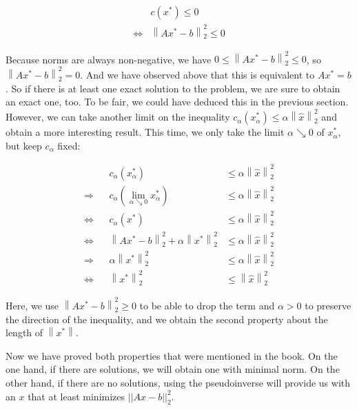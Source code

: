 \documentclass[]{scrartcl}
\begin{document}
\[\begin{align*}
& c \left( x^{*} \right) \leq 0 \\
\Leftrightarrow &  \left\| Ax^{*}-b\right\| _{2}^{2} \le 0
\end{align*}
\]

Because norms are always non-negative, we have
\(0 \le \left\| Ax^{*}-b\right\| _{2}^{2} \le 0\), so
\(\left\| Ax^{*}-b\right\| _{2}^{2} = 0\). And we have observed above
that this is equivalent to \(Ax^{*} = b\). So if there is at least one
exact solution to the problem, we are sure to obtain an exact one, too.
To be fair, we could have deduced this in the previous section. However,
we can take another limit on the inequality
\(c_{\alpha}\left( x_{\alpha }^{*}\right) \leq \alpha \left\| \hat x\right\| _{2}^{2}\)
and obtain a more interesting result. This time, we only take the limit
\(\alpha \searrow 0\) of \(x^{*}_\alpha\), but keep \(c_\alpha\) fixed:

\[
\begin{align*}
&&c_{\alpha}\left( x_{\alpha }^{*}\right) &\leq \alpha \left\| \hat x\right\| _{2}^{2} \\
\Rightarrow  && c_{\alpha}\left( \lim_{\alpha \searrow 0} x_{\alpha }^{*}\right) &\leq \alpha \left\| \hat x\right\| _{2}^{2}  \\
\Leftrightarrow && c_{\alpha}\left( x^{*} \right) &\leq \alpha \left\| \hat x\right\| _{2}^{2} \\
\Leftrightarrow && \left\| Ax^{*}-b\right\| _{2}^{2}+\alpha \left\| x^{*}\right\| _{2}^{2} &\leq \alpha \left\| \hat x\right\| _{2}^{2} \\
\Rightarrow && \alpha \left\| x^{*}\right\| _{2}^{2} &\leq \alpha \left\| \hat x\right\| _{2}^{2} \\
\Leftrightarrow && \left\| x^{*}\right\| _{2}^{2} &\leq \left\| \hat x\right\| _{2}^{2} 
\end{align*}
\]

Here, we use \(\left\| Ax^{*}-b\right\| _{2}^{2} \ge 0\) to be able to
drop the term and \(\alpha > 0\) to preserve the direction of the
inequality, and we obtain the second property about the length of
\(\left \| x^{*} \right \|\).

Now we have proved both properties that were mentioned in the book. On
the one hand, if there are solutions, we will obtain one with minimal
norm. On the other hand, if there are no solutions, using the
pseudoinverse will provide us with an \(x\) that at least minimizes
\(\left| \left| Ax-b\right| \right| _{2}^{2}\).
\end{document}
